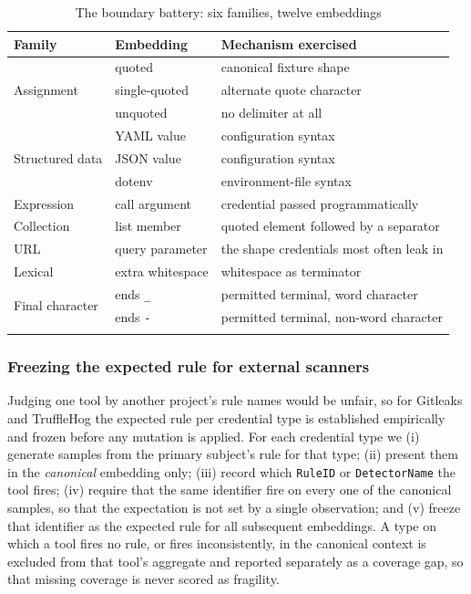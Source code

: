 \documentclass[pdflatex,sn-basic]{sn-jnl}
\begin{document}
\begin{table}[t]
\centering
\caption{The boundary battery: six families, twelve embeddings}
\label{tab:taxonomy}
\small
\setlength{\tabcolsep}{3.5pt}
\begin{tabular}{@{}llp{3.25cm}@{}}
\toprule
Family & Embedding & Mechanism exercised \\
\midrule
\multirow{3}{*}{Assignment}
 & quoted & canonical fixture shape \\
 & single-quoted & alternate quote character \\
 & unquoted & no delimiter at all \\
\midrule
\multirow{3}{*}{Structured data}
 & YAML value & configuration syntax \\
 & JSON value & configuration syntax \\
 & dotenv & environment-file syntax \\
\midrule
Expression
 & call argument & credential passed programmatically \\
\midrule
Collection
 & list member & quoted element followed by a separator \\
\midrule
URL
 & query parameter & the shape credentials most often leak in \\
\midrule
Lexical
 & extra whitespace & whitespace as terminator \\
\midrule
\multirow{2}{*}{Final character}
 & ends \texttt{\_} & permitted terminal, word character \\
 & ends \texttt{-} & permitted terminal, non-word character \\
\botrule
\end{tabular}
\end{table}

\subsubsection*{Freezing the expected rule for external scanners}
\label{sec:freeze}

Judging one tool by another project's rule names would be unfair, so for Gitleaks and TruffleHog the expected rule per credential type is established empirically and frozen before any mutation is applied. For each credential type we (i) generate samples from the primary subject's rule for that type; (ii) present them in the \emph{canonical} embedding only; (iii) record which \texttt{RuleID} or \texttt{DetectorName} the tool fires; (iv) require that the same identifier fire on every one of the canonical samples, so that the expectation is not set by a single observation; and (v) freeze that identifier as the expected rule for all subsequent embeddings. A type on which a tool fires no rule, or fires inconsistently, in the canonical context is excluded from that tool's aggregate and reported separately as a coverage gap, so that missing coverage is never scored as fragility.
\end{document}
